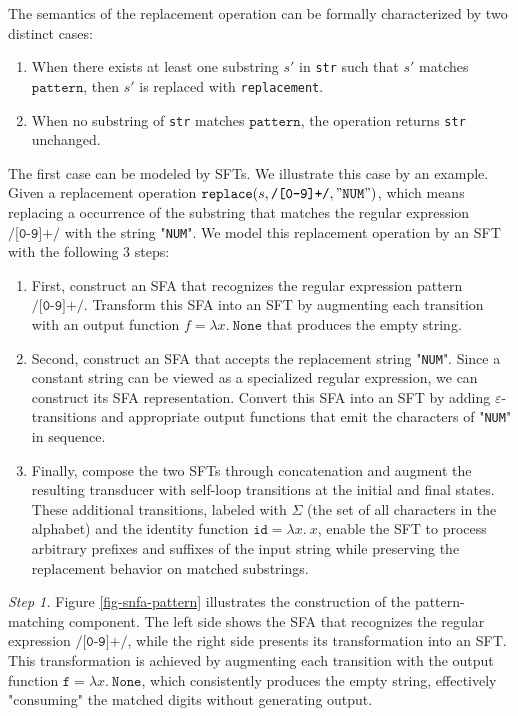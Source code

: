 The semantics of the replacement operation can be formally characterized by two distinct cases:
\begin{enumerate}
  \item When there exists at least one substring $s'$ in \texttt{str} such that $s'$ matches $\texttt{pattern}$, then $s'$ is replaced with \texttt{replacement}.
  \item When no substring of \texttt{str} matches $\texttt{pattern}$, the operation returns \texttt{str} unchanged.
\end{enumerate}

The first case can be modeled by SFTs. We illustrate this case by an example. Given a replacement operation $\texttt{replace}\newline(s, \texttt{/[0-9]+/}, "\texttt{NUM}")$, which means replacing a occurrence of the substring that matches the regular expression $\texttt{/[0-9]+/}$ with the string "\texttt{NUM}".
We model this replacement operation by an SFT with the following 3 steps:

\begin{enumerate}
  \item First, construct an SFA that recognizes the regular expression pattern $\texttt{/[0-9]+/}$. Transform this SFA into an SFT by augmenting each transition with an output function $f = \lambda x.~\texttt{None}$ that produces the empty string. 
  \item Second, construct an SFA that accepts the replacement string "\texttt{NUM}". Since a constant string can be viewed as a specialized regular expression, we can construct its SFA representation. Convert this SFA into an SFT by adding $\varepsilon$-transitions  and appropriate output functions that emit the characters of "\texttt{NUM}" in sequence.
  \item Finally, compose the two SFTs through concatenation and augment the resulting transducer with self-loop transitions at the initial and final states. These additional transitions, labeled with $\Sigma$ (the set of all characters in the alphabet) and the identity function $\texttt{id}=\lambda x.~x$, enable the SFT to process arbitrary prefixes and suffixes of the input string while preserving the replacement behavior on matched substrings.
\end{enumerate}


\noindent\emph{Step 1.}
Figure \ref{fig-snfa-pattern} illustrates the construction of the pattern-matching component. The left side shows the SFA that recognizes the regular expression $\texttt{/[0-9]+/}$, while the right side presents its transformation into an SFT. This transformation is achieved by augmenting each transition with the output function $\texttt{f} = \lambda x.~\texttt{None}$, which consistently produces the empty string, effectively "consuming" the matched digits without generating output.





